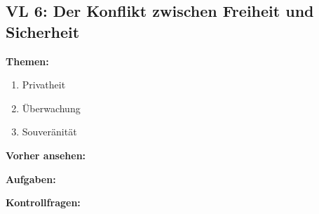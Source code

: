 \documentclass[a4paper]{article}%
\begin{document}
\clearpage
\subsection{VL 6: Der Konflikt zwischen Freiheit und Sicherheit}


\textbf{Themen:}


\begin{enumerate}
\item Privatheit
\item Überwachung
\item Souveränität
\end{enumerate}


\textbf{Vorher ansehen:}


\bigskip

\textbf{Aufgaben:}



\bigskip


\textbf{Kontrollfragen:}
\end{document}
